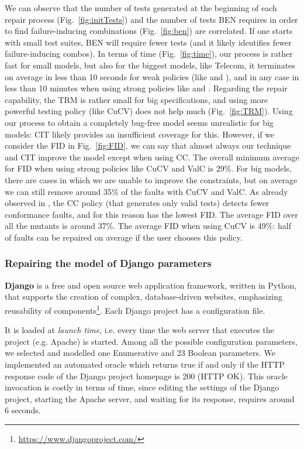 \begin{tikzborder}{\cite{Gargantini16:validation}}
\begin{tikzborder}{\cite{gargantini_combinatorial_2017}}
We can observe that the number of tests generated at the beginning of each repair process (Fig.~\ref{fig:initTests}) and the number of tests BEN requires in order to find failure-inducing combinations (Fig.~\ref{fig:ben}) are correlated.  If one starts with small test suites, BEN will require fewer tests (and it likely identifies fewer failure-inducing combos).  In terms of time (Fig.~\ref{fig:time}), our process is rather fast for small models, but also for the biggest models, like Telecom, it terminates on average in less than 10 seconds for weak policies (like \ic and \ccit), and in any case in less than 10 minutes when using strong policies like \cucv and \ValC.
Regarding the repair capability, the TRM is rather small for big specifications, and using more powerful testing policy (like CuCV) does not help much (Fig.~\ref{fig:TRM}). Using our process to obtain a completely bug-free model seems unrealistic for big models: CIT likely provides an insufficient coverage for this. 
However, if we consider  the FID in Fig.~\ref{fig:FID}, we can say that almost always our technique and CIT improve the model except when using CC. The overall minimum average for FID when using strong policies like CuCV and ValC is 29\%. For big models, there are cases in which we are unable to improve the constraints, but on average we can still remove around 35\% of the faults with CuCV and ValC. As already observed in \cite{Gargantini16:validation}, the CC policy (that generates only valid tests) detects fewer conformance faults, and for this reason has the lowest FID. The average FID over all the mutants is around 37\%. The average FID when using CuCV is 49\%: half of faults can be repaired on average if the user chooses this policy.\be

\subsubsection{Repairing the model of Django parameters}

\bb \textbf{Django} is a free and open source web application framework, written in Python, that supports the creation of complex, database-driven websites, emphasizing reusability of components\footnote{\url{https://www.djangoproject.com/}}. Each Django project has a configuration file. 

\noindent It is loaded at \emph{launch time}, i.e. every time the web server that executes the project (e.g. Apache) is started.
Among all the possible configuration parameters, we selected and modelled one Enumerative and 23 Boolean parameters. We implemented an automated oracle which returns true if and only if the HTTP response code of the Django project homepage is 200 (HTTP OK). This oracle invocation is costly in terms of time, since editing the settings of the Django project, starting the Apache server, and waiting for its response, requires around 6 seconds.


\end{tikzborder}
\end{tikzborder}
